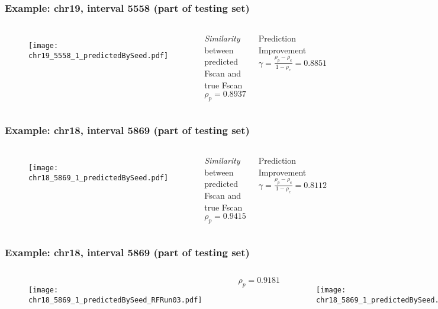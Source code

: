 \documentclass[10pt,dvipsnames,table]{beamer}
\begin{document}
\begin{frame}
\frametitle{Example: chr19, interval 5558 (part of testing set)}
\begin{columns}[t]
\begin{figure}
\texttt{[image: chr19\_5558\_1\_predictedBySeed.pdf]}
\end{figure}

\begin{block}{{\emph{Similarity}} between predicted Fscan and true Fscan}
$\rho_{p} = 0.8937$
\end{block}

\begin{block}{Prediction Improvement}
$\gamma = \frac{\rho_{p} - \rho_{c}}{1 - \rho_{c}} = 0.8851 $
\end{block}

\end{columns}
\end{frame}

\begin{frame}
\frametitle{Example: chr18, interval 5869 (part of testing set)}
\begin{columns}[t]
\begin{figure}
\texttt{[image: chr18\_5869\_1\_predictedBySeed.pdf]}
\end{figure}

\begin{block}{{\emph{Similarity}} between predicted Fscan and true Fscan}
 $\rho_{p} = 0.9415$
\end{block}

\begin{block}{Prediction Improvement}
$\gamma = \frac{\rho_{p} - \rho_{c}}{1 - \rho_{c}} = 0.8112 $
\end{block}

\end{columns}
\end{frame}

\begin{frame}
\frametitle{Example: chr18, interval 5869 (part of testing set)}

\begin{columns}
\begin{figure}
\texttt{[image: chr18\_5869\_1\_predictedBySeed\_RFRun03.pdf]}
\end{figure}
 $\rho_{p} = 0.9181$

\begin{figure}
\texttt{[image: chr18\_5869\_1\_predictedBySeed.pdf]}
\end{figure}
 $\rho_{p} = 0.9415$
\end{columns}
\end{frame}
\end{document}
